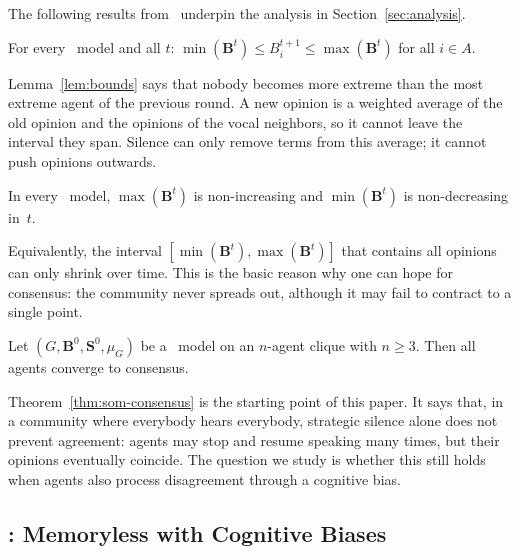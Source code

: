 The following results from~\cite{aranda2024sound}
underpin the analysis in Section~\ref{sec:analysis}.

\begin{lemma}
\label{lem:bounds}
  For every \SOMminus\ model and all $t$:
  $\min(\mathbf{B}^t)\le B_i^{t+1}\le\max(\mathbf{B}^t)$
  for all $i\in A$.
\end{lemma}

Lemma~\ref{lem:bounds} says that nobody becomes more extreme than the
most extreme agent of the previous round. A new opinion is a weighted
average of the old opinion and the opinions of the vocal neighbors, so
it cannot leave the interval they span. Silence can only remove
terms from this average; it cannot push opinions outwards.

\begin{corollary}
\label{cor:mono}
  In every \SOMminus\ model, $\max(\mathbf{B}^t)$ is non-increasing
  and $\min(\mathbf{B}^t)$ is non-decreasing in~$t$.
\end{corollary}

Equivalently, the interval $[\min(\mathbf{B}^t),\max(\mathbf{B}^t)]$
that contains all opinions can only shrink over time. This is the basic
reason why one can hope for consensus: the community never spreads
out, although it may fail to contract to a single point.

\begin{theorem}
\label{thm:som-consensus}
  Let $(G,\mathbf{B}^0,\mathbf{S}^0,\mu_G)$ be a \SOMminus\ model
  on an $n$-agent clique with $n\ge 3$.
  Then all agents converge to consensus.
\end{theorem}

Theorem~\ref{thm:som-consensus} is the starting point of this paper. It
says that, in a community where everybody hears everybody, strategic
silence alone does not prevent agreement: agents may stop and resume
speaking many times, but their opinions eventually coincide. The question
we study is whether this still holds when agents also process
disagreement through a cognitive bias.

\subsection{\texorpdfstring{\CBSOMminus}{CBSOM-}: Memoryless with Cognitive Biases}
\label{sec:cbsom-minus}

